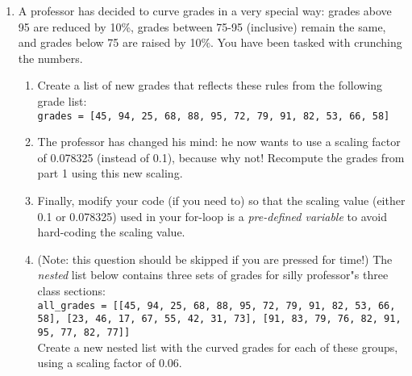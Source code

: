 \documentclass{article}[12pt]
\newcommand{\code}[1]{\texttt{#1}}  %
\begin{document}
\begin{enumerate}
	
	\item A professor has decided to curve grades in a very special way: grades above 95 are reduced by 10\%, grades between 75-95 (inclusive) remain the same, and grades below 75 are raised by 10\%. You have been tasked with crunching the numbers.
	
	\begin{enumerate}
		\item Create a list of new grades that reflects these rules from the following grade list: \\
		\code{grades = [45, 94, 25, 68, 88, 95, 72, 79, 91, 82, 53, 66, 58]} 
		
		\item The professor has changed his mind: he now wants to use a scaling factor of 0.078325 (instead of 0.1), because why not! Recompute the grades from part 1 using this new scaling. 
		 
		\item Finally, modify your code (if you need to) so that the scaling value (either 0.1 or 0.078325) used in your for-loop is a \emph{pre-defined variable} to avoid hard-coding the scaling value.
		
		\item (Note: this question should be skipped if you are pressed for time!) The \emph{nested} list below contains three sets of grades for silly professor"s three class sections: \\ 
		\code{all\_grades = [[45, 94, 25, 68, 88, 95, 72, 79, 91, 82, 53, 66, 58], [23, 46, 17, 67, 55, 42, 31, 73], [91, 83, 79, 76, 82, 91, 95, 77, 82, 77]]}
		\\ Create a new nested list with the curved grades for each of these groups, using a scaling factor of 0.06.
	\end{enumerate}
	


\end{enumerate}
\end{document}
